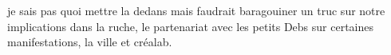 je sais pas quoi mettre la dedans mais faudrait baragouiner un truc sur notre implications dans la ruche, le partenariat
avec les petits Debs sur certaines manifestations, la ville et créalab.


